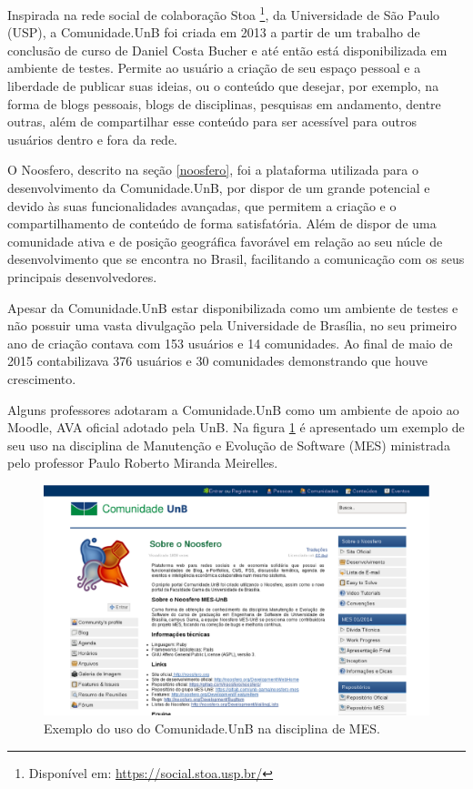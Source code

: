 Inspirada na rede social de colaboração Stoa \footnote{Disponível em: \url{https://social.stoa.usp.br/}}, da Universidade de São Paulo (USP), a Comunidade.UnB foi criada em 2013 a partir de um trabalho de conclusão de curso de Daniel Costa Bucher e até então está disponibilizada em ambiente de testes. Permite ao usuário a criação de seu espaço pessoal e a liberdade de publicar suas ideias, ou o conteúdo que desejar, por exemplo, na forma de blogs pessoais, blogs de disciplinas, pesquisas em andamento, dentre outras, além de compartilhar esse conteúdo para ser acessível para outros usuários dentro e fora da rede.

O Noosfero, descrito na seção \ref{noosfero}, foi a plataforma utilizada para o desenvolvimento da Comunidade.UnB, por dispor de um grande potencial e devido às suas funcionalidades avançadas, que permitem a criação e o compartilhamento de conteúdo de forma satisfatória. Além de dispor de uma comunidade ativa e de posição geográfica favorável em relação ao seu núcle de desenvolvimento que se encontra no Brasil, facilitando a comunicação com os seus principais desenvolvedores.

Apesar da Comunidade.UnB estar disponibilizada como um ambiente de testes e não possuir uma vasta divulgação pela Universidade de Brasília, no seu primeiro ano de criação contava com 153 usuários e 14 comunidades. Ao final de maio de 2015 contabilizava 376 usuários e 30 comunidades demonstrando que houve crescimento.

Alguns professores adotaram a Comunidade.UnB como um ambiente de apoio ao Moodle, AVA oficial adotado pela UnB. Na figura \ref{comunidade-mes} é apresentado um exemplo de seu uso na disciplina de Manutenção e Evolução de Software (MES) ministrada pelo professor Paulo Roberto Miranda Meirelles.

\begin{figure}[!htb]
    \centering
    \includegraphics[keepaspectratio=true,scale=0.4]
      {figuras/comunidade-mes.eps}
    \caption{Exemplo do uso do Comunidade.UnB na disciplina de MES.}
    \label{comunidade-mes}
\end{figure}

